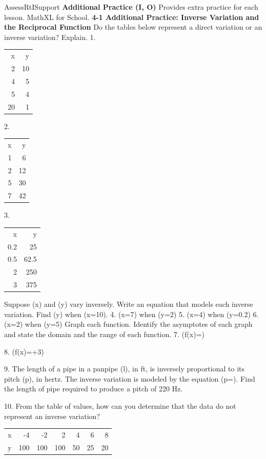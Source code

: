 \documentclass{article}
\newenvironment{te-addendum}[2]{}{}     %
\newcommand{\answer}[1]{}               %
\newcommand{\placeholder}[2]{}          %
\begin{document}
\begin{te-addendum}{Assess}{RtISupport}
\textbf{Additional Practice (I, O)} Provides extra practice for each lesson. MathXL for School.
\textbf{4-1 Additional Practice: Inverse Variation and the Reciprocal Function}
Do the tables below represent a direct variation or an inverse variation? Explain.
1.
\begin{tabular}{rr}
x & y \\
2 & 10 \\
4 & 5 \\
5 & 4 \\
20 & 1 \\
\end{tabular}
\answer{Inverse; (y=\frac{20}{x})}
2.
\begin{tabular}{rr}
x & y \\
1 & 6 \\
2 & 12 \\
5 & 30 \\
7 & 42 \\
\end{tabular}
\answer{Direct; (y=6x)}
3.
\begin{tabular}{rr}
x & y \\
0.2 & 25 \\
0.5 & 62.5 \\
2 & 250 \\
3 & 375 \\
\end{tabular}
\answer{Direct; (y=125x)}
Suppose (x) and (y) vary inversely. Write an equation that models each inverse variation. Find (y) when (x=10).
4. (x=7) when (y=2) \answer{(y=\frac{14}{x}); (\frac{7}{5})}
5. (x=4) when (y=0.2) \answer{(y=\frac{4}{5x}); 0.08 or (\frac{2}{25})}
6. (x=2) when (y=5) \answer{(y=\frac{10}{x}); 1}
Graph each function. Identify the asymptotes of each graph and state the domain and the range of each function.
7. (f(x)=)
\placeholder{graph}{Magenta f(x)=12/x in quadrants I,III with four end arrows; axes x,y,O and grid, window -12 to12 both, grid3, positive tick labels6 on x,y. No marked points; asymptotes axes.}
\answer{Asymptotes: (x=0), (y=0). Domain: all real numbers except (x=0). Range: all real numbers except (y=0).}
8. (f(x)=+3)
\placeholder{graph}{Magenta f(x)=1/x+3, vertical asymptote x=0 and dashed horizontal y=3; axes x,y,O, unit grid window x -4 to4,y -2 to6, labels x -2,2 and y4; curve arrows at four ends.}
\answer{Asymptotes: (x=0), (y=3). Domain: all real numbers except (x=0). Range: all real numbers except (y=3).}
9. The length of a pipe in a panpipe (l), in ft, is inversely proportional to its pitch (p), in hertz. The inverse variation is modeled by the equation (p=). Find the length of pipe required to produce a pitch of 220 Hz.
\answer{about 2.26 ft}
10. From the table of values, how can you determine that the data do not represent an inverse variation?
\begin{tabular}{lrrrrrr}
x & -4 & -2 & 2 & 4 & 6 & 8 \\
y & 100 & 100 & 100 & 50 & 25 & 20 \\
\end{tabular}
\answer{Sample answer: The product (xy) is not constant.}
\end{te-addendum}
\end{document}
